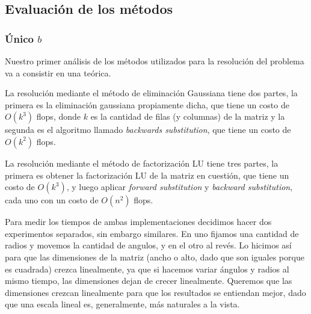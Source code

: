 \subsection{Evaluación de los métodos}

\subsubsection{Único $b$}
Nuestro primer análisis de los métodos utilizados para la resolución del problema va a consistir en una teórica. 

La resolución mediante el método de eliminación Gaussiana tiene dos partes, la primera es la eliminación gaussiana propiamente dicha, que tiene un costo de $O(k^3)$ flops, donde $k$ es la cantidad de filas (y columnas) de la matriz y la segunda es el algoritmo llamado \emph{backwards substitution}, que tiene un costo de $O(k^2)$ flops.

La resolución mediante el método de factorización LU tiene tres partes, la primera es obtener la factorización LU de la matriz en cuestión, que tiene un costo de $O(k^3)$, y luego aplicar \emph{forward substitution} y \emph{backward substitution}, cada uno con un costo de $O(n^2)$ flops.



Para medir los tiempos de ambas implementaciones decidimos hacer dos experimentos separados, sin embargo similares. 
En uno fijamos una cantidad de radios y movemos la cantidad de angulos, y en el otro al revés.
Lo hicimos así para que las dimensiones de la matriz (ancho o alto, dado que son iguales porque es cuadrada) crezca linealmente, ya que si hacemos variar ángulos y radios al mismo tiempo, las dimensiones dejan de crecer linealmente.
Queremos que las dimensiones crezcan linealmente para que los resultados se entiendan mejor, dado que una escala lineal es, generalmente, más naturales a la vista.


